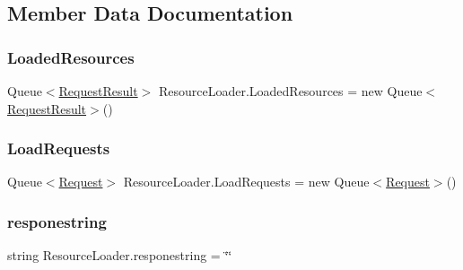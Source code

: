 \subsection{Member Data Documentation}
\mbox{\label{class_resource_loader_aac461f634dc821609293616d32e7288e}} 
\subsubsection{\texorpdfstring{Loaded\+Resources}{LoadedResources}}
{\footnotesize\ttfamily Queue$<$\mbox{\hyperlink{struct_resource_loader_1_1_request_result}{Request\+Result}}$>$ Resource\+Loader.\+Loaded\+Resources = new Queue$<$\mbox{\hyperlink{struct_resource_loader_1_1_request_result}{Request\+Result}}$>$()\hspace{0.3cm}{\ttfamily [private]}}

\mbox{\label{class_resource_loader_acd6d1957bdc4e0212991af05e3454633}} 
\subsubsection{\texorpdfstring{Load\+Requests}{LoadRequests}}
{\footnotesize\ttfamily Queue$<$\mbox{\hyperlink{struct_resource_loader_1_1_request}{Request}}$>$ Resource\+Loader.\+Load\+Requests = new Queue$<$\mbox{\hyperlink{struct_resource_loader_1_1_request}{Request}}$>$()\hspace{0.3cm}{\ttfamily [private]}}

\mbox{\label{class_resource_loader_adeb4ddafee015e2630ed66e26ec4a4ae}} 
\subsubsection{\texorpdfstring{responestring}{responestring}}
{\footnotesize\ttfamily string Resource\+Loader.\+responestring = \char`\"{}\char`\"{}}



